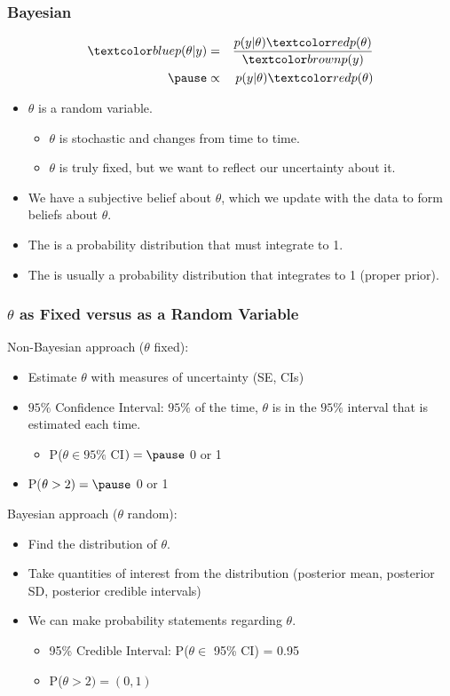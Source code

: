 \documentclass{beamer}
\begin{document}
\begin{frame}
\frametitle{Bayesian}
\pause
\begin{eqnarray*}
\blue{p(\theta | y)} &=& \frac{p(y | \theta) \red{p(\theta)}
}{\brown{p(y)}} \\
\pause
&\propto& p(y | \theta) \red{p(\theta)}
\end{eqnarray*}
\pause
\begin{itemize}
\item $\theta$ is a random variable.
\pause
\begin{itemize}
\item $\theta$ is stochastic and changes from time to time.
\pause
\item $\theta$ is truly fixed, but we want to reflect our uncertainty
about it.
\end{itemize}
\pause
\item We have a  subjective belief about $\theta$, which we
update with the data to form  beliefs about $\theta$.
\pause
\item The  is a probability
distribution that must integrate to 1.
\pause
\item The  is usually a probability distribution that
integrates to 1 (proper prior). 
\end{itemize}
\end{frame}

\begin{frame}
\frametitle{$\theta$ as Fixed versus as a Random Variable}
\pause
Non-Bayesian approach ($\theta$ fixed):
\pause
\begin{itemize}
\item Estimate $\theta$ with measures of uncertainty (SE, CIs)
\pause
\item $95\%$ Confidence Interval: $95\%$ of the time, $\theta$ is in the
$95\%$ interval that is estimated each time.
\begin{itemize}
\pause
\item P($\theta \in 95\%$ CI$) = \pause$ 0 or 1  
\end{itemize}
\pause
\item P($\theta > 2) = \pause$ 0 or 1
\end{itemize}
\pause
\bigskip
Bayesian approach ($\theta$ random):
\pause
\begin{itemize}
\item Find the  distribution of $\theta$.
\pause
\item Take quantities of interest from the distribution (posterior
mean, posterior SD, posterior credible intervals)
\pause
\item We can make probability statements regarding $\theta$.
\pause
\begin{itemize}
\item 95\% Credible Interval: \pause P($\theta \in$ 95\% CI) = 0.95
\pause
\item P($\theta > 2) = (0,1)$
\end{itemize} 
\end{itemize}
\end{frame}
\end{document}
